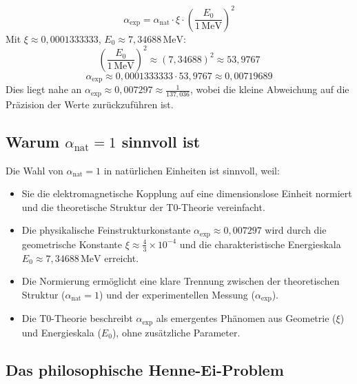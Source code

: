 \documentclass[12pt,a4paper]{article}
\theoremstyle{definition}
\begin{document}
\[
\alpha_{\text{exp}} = \alpha_{\text{nat}} \cdot \xi \cdot \left(\frac{E_0}{1 \, \text{MeV}}\right)^2
\]
Mit \(\xi \approx 0{,}0001333333\), \(E_0 \approx 7{,}34688 \, \text{MeV}\):
\[
\left(\frac{E_0}{1 \, \text{MeV}}\right)^2 \approx (7{,}34688)^2 \approx 53{,}9767
\]
\[
\alpha_{\text{exp}} \approx 0{,}0001333333 \cdot 53{,}9767 \approx 0{,}00719689
\]
Dies liegt nahe an \(\alpha_{\text{exp}} \approx 0{,}007297 \approx \frac{1}{137{,}036}\), wobei die kleine Abweichung auf die Präzision der Werte zurückzuführen ist.

\subsection*{Warum \(\alpha_{\text{nat}} = 1\) sinnvoll ist}

Die Wahl von \(\alpha_{\text{nat}} = 1\) in natürlichen Einheiten ist sinnvoll, weil:
\begin{itemize}
	\item Sie die elektromagnetische Kopplung auf eine dimensionslose Einheit normiert und die theoretische Struktur der T0-Theorie vereinfacht.
	\item Die physikalische Feinstrukturkonstante \(\alpha_{\text{exp}} \approx 0{,}007297\) wird durch die geometrische Konstante \(\xi \approx \frac{4}{3} \times 10^{-4}\) und die charakteristische Energieskala \(E_0 \approx 7{,}34688 \, \text{MeV}\) erreicht.
	\item Die Normierung ermöglicht eine klare Trennung zwischen der theoretischen Struktur (\(\alpha_{\text{nat}} = 1\)) und der experimentellen Messung (\(\alpha_{\text{exp}}\)).
	\item Die T0-Theorie beschreibt \(\alpha_{\text{exp}}\) als emergentes Phänomen aus Geometrie (\(\xi\)) und Energieskala (\(E_0\)), ohne zusätzliche Parameter.
\end{itemize}
\subsection*{Das philosophische Henne-Ei-Problem}
\end{document}
